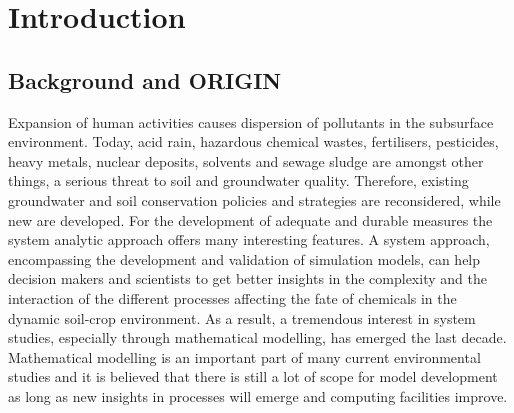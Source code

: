 \chapter{Introduction}

\section{Background and ORIGIN}

Expansion of human activities causes dispersion of pollutants in the subsurface environment. Today, acid rain, hazardous chemical wastes, fertilisers, pesticides, heavy metals, nuclear deposits, solvents and sewage sludge are amongst other things, a serious threat to soil and groundwater quality. Therefore, existing groundwater and soil conservation policies and strategies are reconsidered, while new are developed. For the development of adequate and durable measures the system analytic approach offers many interesting features. A system approach, encompassing the development and validation of simulation models, can help decision makers and scientists to get better insights in the complexity and the interaction of the different processes affecting the fate of chemicals in the dynamic soil-crop environment. As a result, a tremendous interest in system studies, especially through mathematical modelling, has emerged the last decade. Mathematical modelling is an important part of many current environmental studies and it is believed that there is still a lot of scope for model development as long as new insights in processes will emerge and computing facilities improve.\\

